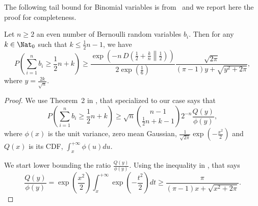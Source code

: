 The following tail bound for Binomial variables is from~\cite{Orabona13} and we report here the proof for completeness.
\begin{theorem}
\label{lemma:bin}
Let $n\geq2$ an even number of Bernoulli random variables $b_i$. Then for any $k \in \Nat_0$ such that $k\leq \frac{1}{2}n-1$, we have
\[
P\left( \sum_{i=1}^n b_i \geq \frac{1}{2} n + k\right) 
\geq  \frac{\exp\left(-n\, D\left(\frac{1}{2}+\frac{k}{n}\middle\|\frac{1}{2}\right)\right)}{2 \exp\left(\frac{1}{6}\right)} \frac{\sqrt{2 \pi}}{(\pi-1)y+\sqrt{y^2+2 \pi}},
\]
where $y=\frac{2 k}{\sqrt{n}}$.
\end{theorem}
\begin{proof}
We use Theorem~2 in \cite{McKay1989}, that specialized to our case says that
\begin{equation}
\label{eq:bin_1}
P\left( \sum_{i=1}^n b_i \geq  \frac{1}{2} n + k  \right) 
\geq \sqrt{n} \binom{n-1}{ \frac{1}{2} n + k -1} 2^{-n} \frac{Q(y)}{\phi(y)},
\end{equation}
where $\phi(x)$ is the unit variance, zero mean Gaussian, $\frac{1}{\sqrt{2 \pi}} \exp(-\frac{x^2}{2})$ and $Q(x)$ is its CDF, $\int_{x}^{+\infty} \phi(u) du$.

We start lower bounding the ratio $\frac{Q(y)}{\phi(y)}$. Using the inequality in \cite{Boyd59}, that says
\[
\frac{Q(y)}{\phi(y)} 
= \exp\left(\frac{x^2}{2}\right) \int_{x}^{+\infty} \exp\left(-\frac{t^2}{2}\right) dt
\geq \frac{\pi}{(\pi-1)x+\sqrt{x^2+2 \pi}}.
\]


\end{proof}
